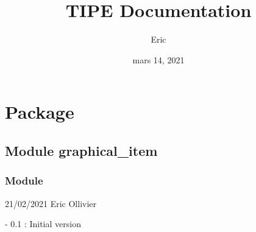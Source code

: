 \documentclass[a4paper,10pt,french]{sphinxmanual}
\title{TIPE Documentation}
\date{mars 14, 2021}
\author{Eric}
\begin{document}
\maketitle
\sphinxtableofcontents
{}\label{\detokenize{index::doc}}



\chapter{Package }
\label{\detokenize{road_objects/package:documentation-sur-le-projet-tipe}}\label{\detokenize{road_objects/package::doc}}\label{\detokenize{road_objects/package:package-road-objects}}

\section{Module graphical\_item}
\label{\detokenize{road_objects/graphical_item:module-graphical-item}}\label{\detokenize{road_objects/graphical_item::doc}}\label{\detokenize{road_objects/graphical_item:module-road_objects.graphical_item}}

\subsection{Module }
\label{\detokenize{road_objects/graphical_item:module-graphical-item-py}}
 21/02/2021  Eric Ollivier

- 0.1 : Initial version
\end{document}
